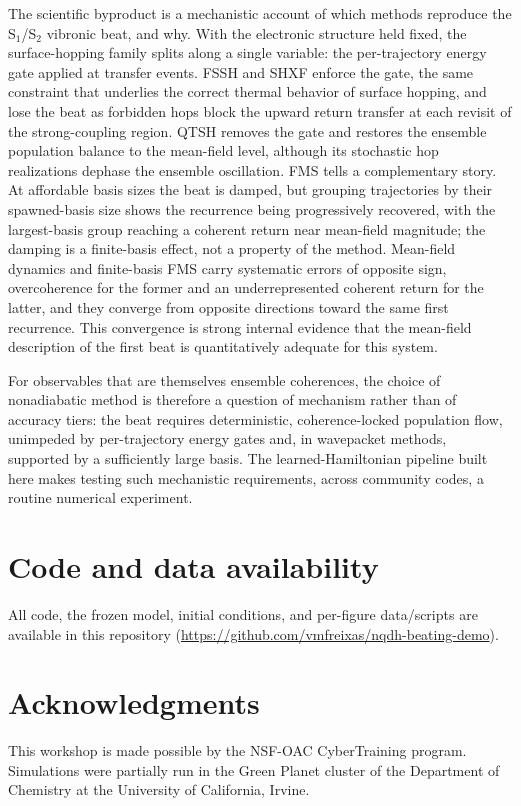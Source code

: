 \documentclass[11pt]{article}
\begin{document}
The scientific byproduct is a mechanistic account of which methods reproduce the S$_1$/S$_2$ vibronic beat, and why. With the electronic structure held fixed, the surface-hopping family splits along a single variable: the per-trajectory energy gate applied at transfer events. FSSH and SHXF enforce the gate, the same constraint that underlies the correct thermal behavior of surface hopping, and lose the beat as forbidden hops block the upward return transfer at each revisit of the strong-coupling region. QTSH removes the gate and restores the ensemble population balance to the mean-field level, although its stochastic hop realizations dephase the ensemble oscillation. FMS tells a complementary story. At affordable basis sizes the beat is damped, but grouping trajectories by their spawned-basis size shows the recurrence being progressively recovered, with the largest-basis group reaching a coherent return near mean-field magnitude; the damping is a finite-basis effect, not a property of the method. Mean-field dynamics and finite-basis FMS carry systematic errors of opposite sign, overcoherence for the former and an underrepresented coherent return for the latter, and they converge from opposite directions toward the same first recurrence. This convergence is strong internal evidence that the mean-field description of the first beat is quantitatively adequate for this system.

For observables that are themselves ensemble coherences, the choice of nonadiabatic method is therefore a question of mechanism rather than of accuracy tiers: the beat requires deterministic, coherence-locked population flow, unimpeded by per-trajectory energy gates and, in wavepacket methods, supported by a sufficiently large basis. The learned-Hamiltonian pipeline built here makes testing such mechanistic requirements, across community codes, a routine numerical experiment.

\section*{Code and data availability}
All code, the frozen model, initial conditions, and per-figure data/scripts
are available in this repository
(\url{https://github.com/vmfreixas/nqdh-beating-demo}).

\section*{Acknowledgments}
This workshop is made possible by the NSF-OAC CyberTraining program. Simulations were partially run in the Green Planet cluster of the Department of Chemistry at the University of California, Irvine.



\end{document}
